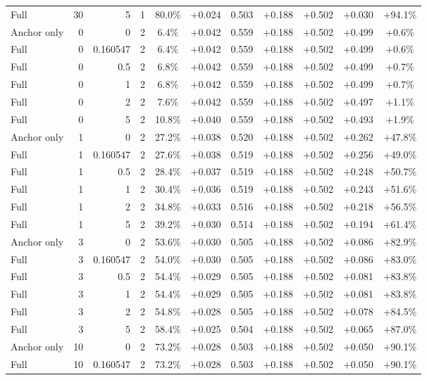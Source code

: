 \begin{table}[htbp]
\begin{tabular}{lrrrccccccc}
Full & 30 & 5 & 1 & 80.0\% & +0.024 & 0.503 & +0.188 & +0.502 & +0.030 & +94.1\% \\
Anchor only & 0 & 0 & 2 & 6.4\% & +0.042 & 0.559 & +0.188 & +0.502 & +0.499 & +0.6\% \\
Full & 0 & 0.160547 & 2 & 6.4\% & +0.042 & 0.559 & +0.188 & +0.502 & +0.499 & +0.6\% \\
Full & 0 & 0.5 & 2 & 6.8\% & +0.042 & 0.559 & +0.188 & +0.502 & +0.499 & +0.7\% \\
Full & 0 & 1 & 2 & 6.8\% & +0.042 & 0.559 & +0.188 & +0.502 & +0.499 & +0.7\% \\
Full & 0 & 2 & 2 & 7.6\% & +0.042 & 0.559 & +0.188 & +0.502 & +0.497 & +1.1\% \\
Full & 0 & 5 & 2 & 10.8\% & +0.040 & 0.559 & +0.188 & +0.502 & +0.493 & +1.9\% \\
Anchor only & 1 & 0 & 2 & 27.2\% & +0.038 & 0.520 & +0.188 & +0.502 & +0.262 & +47.8\% \\
Full & 1 & 0.160547 & 2 & 27.6\% & +0.038 & 0.519 & +0.188 & +0.502 & +0.256 & +49.0\% \\
Full & 1 & 0.5 & 2 & 28.4\% & +0.037 & 0.519 & +0.188 & +0.502 & +0.248 & +50.7\% \\
Full & 1 & 1 & 2 & 30.4\% & +0.036 & 0.519 & +0.188 & +0.502 & +0.243 & +51.6\% \\
Full & 1 & 2 & 2 & 34.8\% & +0.033 & 0.516 & +0.188 & +0.502 & +0.218 & +56.5\% \\
Full & 1 & 5 & 2 & 39.2\% & +0.030 & 0.514 & +0.188 & +0.502 & +0.194 & +61.4\% \\
Anchor only & 3 & 0 & 2 & 53.6\% & +0.030 & 0.505 & +0.188 & +0.502 & +0.086 & +82.9\% \\
Full & 3 & 0.160547 & 2 & 54.0\% & +0.030 & 0.505 & +0.188 & +0.502 & +0.086 & +83.0\% \\
Full & 3 & 0.5 & 2 & 54.4\% & +0.029 & 0.505 & +0.188 & +0.502 & +0.081 & +83.8\% \\
Full & 3 & 1 & 2 & 54.4\% & +0.029 & 0.505 & +0.188 & +0.502 & +0.081 & +83.8\% \\
Full & 3 & 2 & 2 & 54.8\% & +0.028 & 0.505 & +0.188 & +0.502 & +0.078 & +84.5\% \\
Full & 3 & 5 & 2 & 58.4\% & +0.025 & 0.504 & +0.188 & +0.502 & +0.065 & +87.0\% \\
Anchor only & 10 & 0 & 2 & 73.2\% & +0.028 & 0.503 & +0.188 & +0.502 & +0.050 & +90.1\% \\
Full & 10 & 0.160547 & 2 & 73.2\% & +0.028 & 0.503 & +0.188 & +0.502 & +0.050 & +90.1\% \\

\end{tabular}
\end{table}
